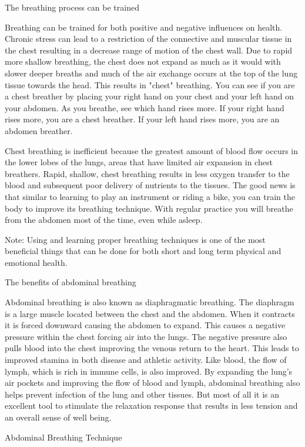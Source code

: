 \documentclass{book}\usepackage[]{graphicx}\usepackage[]{color}
\begin{document}
The breathing process can be trained

Breathing can be trained for both positive and negative influences on health. Chronic stress can lead to a restriction of the connective and muscular tissue in the chest resulting in a decrease range of motion of the chest wall. Due to rapid more shallow breathing, the chest does not expand as much as it would with slower deeper breaths and much of the air exchange occurs at the top of the lung tissue towards the head. This results in "chest" breathing. You can see if you are a chest breather by placing your right hand on your chest and your left hand on your abdomen. As you breathe, see which hand rises more. If your right hand rises more, you are a chest breather. If your left hand rises more, you are an abdomen breather.

Chest breathing is inefficient because the greatest amount of blood flow occurs in the lower lobes of the lungs, areas that have limited air expansion in chest breathers. Rapid, shallow, chest breathing results in less oxygen transfer to the blood and subsequent poor delivery of nutrients to the tissues. The good news is that similar to learning to play an instrument or riding a bike, you can train the body to improve its breathing technique. With regular practice you will breathe from the abdomen most of the time, even while asleep.

Note: Using and learning proper breathing techniques is one of the most beneficial things that can be done for both short and long term physical and emotional health.

The benefits of abdominal breathing

Abdominal breathing is also known as diaphragmatic breathing. The diaphragm is a large muscle located between the chest and the abdomen. When it contracts it is forced downward causing the abdomen to expand. This causes a negative pressure within the chest forcing air into the lungs. The negative pressure also pulls blood into the chest improving the venous return to the heart. This leads to improved stamina in both disease and athletic activity. Like blood, the flow of lymph, which is rich in immune cells, is also improved. By expanding the lung's air pockets and improving the flow of blood and lymph, abdominal breathing also helps prevent infection of the lung and other tissues. But most of all it is an excellent tool to stimulate the relaxation response that results in less tension and an overall sense of well being.

Abdominal Breathing Technique
\end{document}

